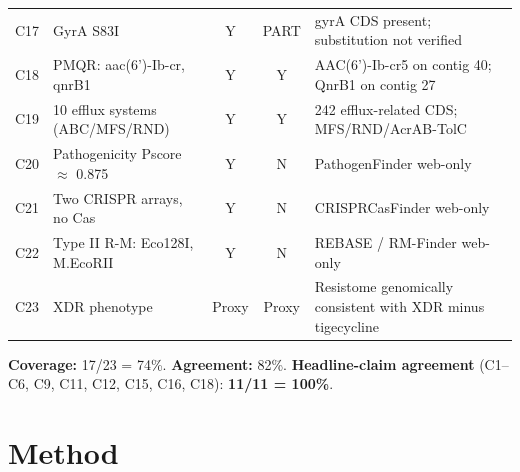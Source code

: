 \documentclass[11pt]{article}
\begin{document}
\begin{longtable}{@{}rp{6.5cm}ccp{4cm}@{}}
C17 & GyrA S83I                              & Y & PART & gyrA CDS present; substitution not verified \\
C18 & PMQR: aac(6')-Ib-cr, qnrB1             & Y & Y & AAC(6')-Ib-cr5 on contig 40; QnrB1 on contig 27 \\
C19 & 10 efflux systems (ABC/MFS/RND)        & Y & Y & 242 efflux-related CDS; MFS/RND/AcrAB-TolC \\
C20 & Pathogenicity Pscore $\approx$ 0.875   & Y & N & PathogenFinder web-only \\
C21 & Two CRISPR arrays, no Cas              & Y & N & CRISPRCasFinder web-only \\
C22 & Type II R-M: Eco128I, M.EcoRII         & Y & N & REBASE / RM-Finder web-only \\
C23 & XDR phenotype                          & Proxy & Proxy & Resistome genomically consistent with XDR minus tigecycline \\
\bottomrule
\end{longtable}

\noindent \textbf{Coverage:} 17/23 = 74\%. \textbf{Agreement:} 82\%.
\textbf{Headline-claim agreement} (C1--C6, C9, C11, C12, C15, C16, C18): \textbf{11/11 = 100\%}.

\section{Method}
\end{document}
